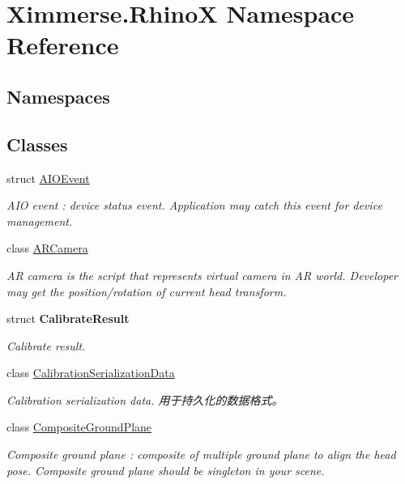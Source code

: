 \hypertarget{namespace_ximmerse_1_1_rhino_x}{}\section{Ximmerse.\+RhinoX Namespace Reference}
\label{namespace_ximmerse_1_1_rhino_x}
\subsection*{Namespaces}
\begin{DoxyCompactItemize}
\end{DoxyCompactItemize}
\subsection*{Classes}
\begin{DoxyCompactItemize}
\item 
struct \mbox{\hyperlink{struct_ximmerse_1_1_rhino_x_1_1_a_i_o_event}{A\+I\+O\+Event}}
\begin{DoxyCompactList}\small\item\em A\+IO event \+: device status event. Application may catch this event for device management. \end{DoxyCompactList}\item 
class \mbox{\hyperlink{class_ximmerse_1_1_rhino_x_1_1_a_r_camera}{A\+R\+Camera}}
\begin{DoxyCompactList}\small\item\em AR camera is the script that represents virtual camera in AR world. Developer may get the position/rotation of current head transform. \end{DoxyCompactList}\item 
struct {\bfseries Calibrate\+Result}
\begin{DoxyCompactList}\small\item\em Calibrate result. \end{DoxyCompactList}\item 
class \mbox{\hyperlink{class_ximmerse_1_1_rhino_x_1_1_calibration_serialization_data}{Calibration\+Serialization\+Data}}
\begin{DoxyCompactList}\small\item\em Calibration serialization data. 用于持久化的数据格式。 \end{DoxyCompactList}\item 
class \mbox{\hyperlink{class_ximmerse_1_1_rhino_x_1_1_composite_ground_plane}{Composite\+Ground\+Plane}}
\begin{DoxyCompactList}\small\item\em Composite ground plane \+: composite of multiple ground plane to align the head pose. Composite ground plane should be singleton in your scene. \end{DoxyCompactList}\item 

\end{DoxyCompactItemize}
